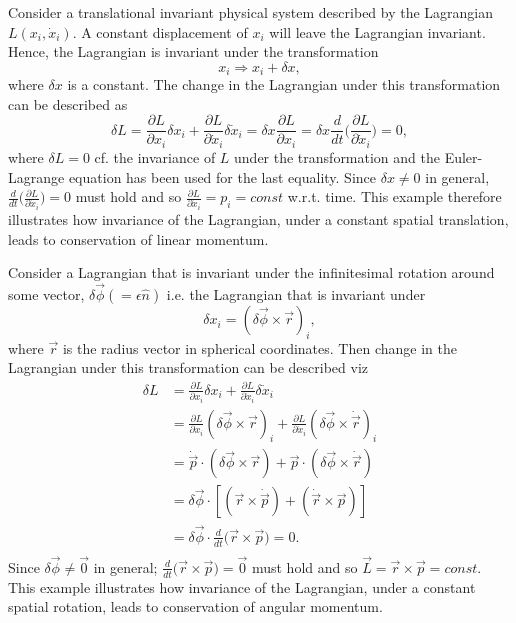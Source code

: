 \begin{example}
	Consider a translational invariant physical system described by the Lagrangian $L(x_i,\dot{x}_i)$. A constant displacement of $x_i$ will leave the Lagrangian invariant. Hence, the Lagrangian is invariant under the transformation
	\begin{equation}
		x_i\Rightarrow x_i+\delta x,
	\end{equation} 
	where $\delta x$ is a constant. The change in the Lagrangian under this transformation can be described as
	\begin{equation}
		\delta L=\frac{\partial L}{\partial x_i}\delta x_i+\frac{\partial L}{\partial \dot{x}_i}\delta\dot{x}_i=\delta x\frac{\partial L}{\partial x_i}=\delta x\frac{d}{dt}\bigg(\frac{\partial L}{\partial \dot{x}_i}\bigg)=0,
	\end{equation} 
	where $\delta L=0$ cf. the invariance of $L$ under the transformation and the Euler-Lagrange equation has been used for the last equality. Since $\delta x\neq0$ in general, $\frac{d}{dt}\big(\frac{\partial L}{\partial \dot{x}_i}\big)=0$ must hold and so $\frac{\partial L}{\partial \dot{x}_i}=p_i=const$ w.r.t. time. This example therefore illustrates how invariance of the Lagrangian, under a constant spatial translation, leads to conservation of linear momentum. 
\end{example}

\begin{example}
	Consider a Lagrangian that is invariant under the infinitesimal rotation around some vector, $\delta \vec{\phi}(=\epsilon \hat{n})$ i.e. the Lagrangian that is invariant under
	\begin{equation}
		\delta x_i=(\delta \vec{\phi} \times \vec{r})_i,
	\end{equation} 
	where $\vec{r}$ is the radius vector in spherical coordinates. Then change in the Lagrangian under this transformation can be described viz
	\begin{equation}
		\begin{split}
			\delta L&=\frac{\partial L}{\partial x_i}\delta x_i+\frac{\partial L}{\partial \dot{x}_i}\delta\dot{x}_i\\
			&=\frac{\partial L}{\partial x_i}(\delta \vec{\phi} \times \vec{r})_i+\frac{\partial L}{\partial \dot{x}_i}(\delta \vec{\phi} \times \dot{\vec{r}})_i\\
			&=\dot{\vec{p}}\cdot(\delta \vec{\phi} \times \vec{r})+\vec{p}\cdot(\delta \vec{\phi} \times \dot{\vec{r}})\\
			&=\delta \vec{\phi}\cdot[(\vec{r}\times\dot{\vec{p}})+(\dot{\vec{r}}\times\vec{p})]\\
			&=\delta\vec{\phi}\cdot\frac{d}{dt}\bigg(\vec{r}\times\vec{p}\bigg)=0.\\
		\end{split}
	\end{equation} 
	Since $\delta \vec{\phi}\neq \vec{0}$ in general; $\frac{d}{dt}\big(\vec{r}\times\vec{p}\big)=\vec{0}$ must hold and so $\vec{L}=\vec{r}\times\vec{p}=const$. This example illustrates how invariance of the Lagrangian, under a constant spatial rotation, leads to conservation of angular momentum.
	
\end{example}

